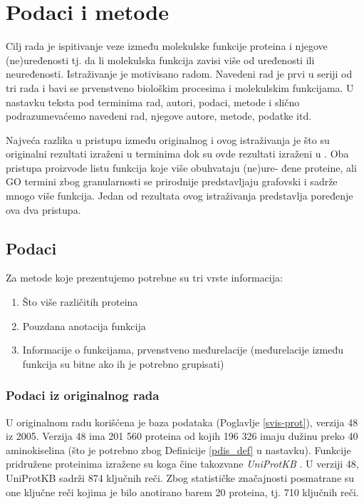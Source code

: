 
\chapter{Podaci i metode} %

\label{Podaci i metode} %

Cilj rada je ispitivanje veze između molekulske funkcije proteina i njegove\\ 
(ne)uređenosti tj. da li molekulska funkcija zavisi više od uređenosti ili
neuređenosti. Istraživanje je motivisano radom\parencite{Xie2007}. Navedeni rad
je prvi u seriji od tri rada i bavi se prvenstveno biološkim procesima i
molekulskim funkcijama.  U nastavku teksta pod terminima 
rad, autori, podaci, metode i slično podrazumevaćemo navedeni rad, njegove
autore, metode, podatke itd.

Najveća razlika u pristupu između originalnog i ovog istraživanja je što su
originalni rezultati izraženi u terminima  dok su ovde
rezultati izraženi u . Oba pristupa proizvode listu
funkcija koje više obuhvataju (ne)ure- đene proteine, ali GO termini zbog
granularnosti se prirodnije predstavljaju grafovski i sadrže mnogo više
funkcija. Jedan od rezultata ovog istraživanja predstavlja poređenje ova dva
pristupa.


\section {Podaci}

Za metode koje prezentujemo potrebne su tri vrste informacija:
\begin{enumerate}
  \item Što više različitih proteina
  \item Pouzdana anotacija funkcija
  \item Informacije o funkcijama, prvenstveno međurelacije (međurelacije između\\ funkcija su bitne  ako ih je potrebno grupisati)
\end{enumerate}


\subsection{Podaci iz originalnog rada}

U originalnom radu \parencite{Xie2007} korišćena je  baza podataka 
\keyword{\swissprot} (Poglavlje \ref{svis-prot}), verzija 48 iz 2005.
Verzija 48 ima 201 560 proteina od kojih 196 326 imaju dužinu preko 40
aminokiselina (što je potrebno zbog Definicije \ref{pdis_def} u nastavku). Funkcije
pridružene proteinima izražene su 
 koga čine takozvane \textit{UniProtKB} 
. U verziji 48, UniProtKB sadrži 874 ključnih reči.  Zbog
statističke značajnosti posmatrane su one ključne reči kojima je bilo anotirano
barem 20 proteina, tj. 710 ključnih reči.

